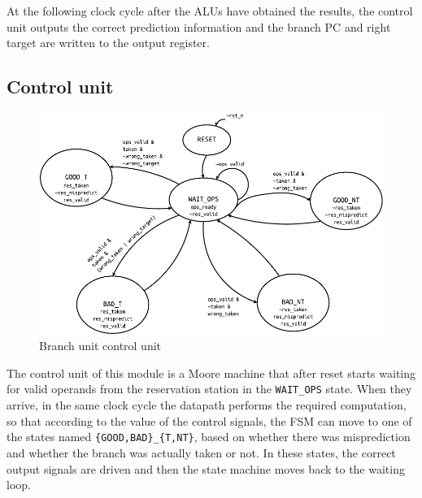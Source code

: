 At the following clock cycle after the ALUs have obtained the results, the control unit outputs the correct prediction information and the branch \ac{PC} and right target are written to the output register.

\subsection{Control unit}
\begin{figure}[hbt]
  \centering
  \includegraphics[width=\textwidth]{img/branch_unit_fsm.pdf}
  \caption{Branch unit control unit}
  \label{fig:branch_unit_fsm}
\end{figure}
The control unit of this module is a Moore machine that after reset starts waiting for valid operands from the reservation station in the \texttt{WAIT\_OPS} state. When they arrive, in the same clock cycle the datapath performs the required computation, so that according to the value of the control signals, the \acs{FSM} can move to one of the states named \texttt{\{GOOD,BAD\}\_\{T,NT\}}, based on whether there was misprediction and whether the branch was actually taken or not. In these states, the correct output signals are driven and then the state machine moves back to the waiting loop.
